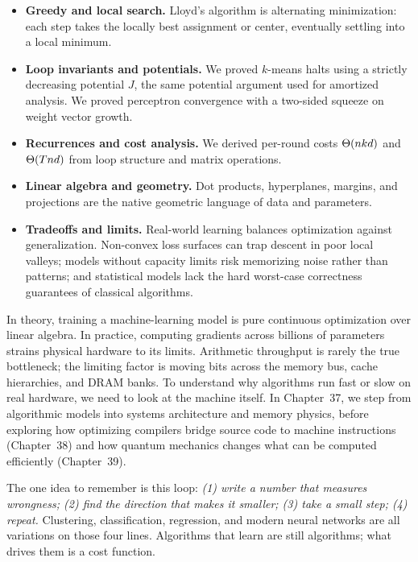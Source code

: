 \begin{itemize}
  \item \textbf{Greedy and local search.} Lloyd's algorithm is alternating
        minimization: each step takes the locally best assignment or center,
        eventually settling into a local minimum.
  \item \textbf{Loop invariants and potentials.} We proved $k$-means halts using
        a strictly decreasing potential $J$, the same potential argument used
        for amortized analysis. We proved perceptron convergence with a two-sided
        squeeze on weight vector growth.
  \item \textbf{Recurrences and cost analysis.} We derived per-round costs
        $\Theta(nkd)$ and $\Theta(Tnd)$ from loop structure and matrix operations.
  \item \textbf{Linear algebra and geometry.} Dot products, hyperplanes, margins,
        and projections are the native geometric language of data and parameters.
  \item \textbf{Tradeoffs and limits.} Real-world learning balances optimization
        against generalization. Non-convex loss surfaces can trap descent in poor
        local valleys; models without capacity limits risk memorizing noise rather than
        patterns; and statistical models lack the hard worst-case correctness
        guarantees of classical algorithms.
\end{itemize}

In theory, training a machine-learning model is pure continuous optimization over
linear algebra. In practice, computing gradients across billions of parameters
strains physical hardware to its limits. Arithmetic throughput is rarely the true
bottleneck; the limiting factor is moving bits across the memory bus, cache
hierarchies, and DRAM banks. To understand why algorithms run fast or slow on
real hardware, we need to look at the machine itself. In
Chapter~37, we step from algorithmic models into systems
architecture and memory physics, before exploring how optimizing compilers bridge
source code to machine instructions (Chapter~38) and how
quantum mechanics changes what can be computed efficiently (Chapter~39).

\begin{recoverybox}
The one idea to remember is this loop:
\emph{(1) write a number that measures wrongness; (2) find the direction that
makes it smaller; (3) take a small step; (4) repeat.} Clustering, classification,
regression, and modern neural networks are all variations on
those four lines. Algorithms that learn are still algorithms; what drives them is a cost
function.
\end{recoverybox}

